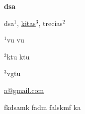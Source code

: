 \documentclass[12pt, twoside, a4paper, hidelinks]{article}
\begin{document}
        \begin{center}  \fontsize{14}{15}\selectfont \textbf{dsa} \end{center}
        \vspace{-0.8cm}\begin{center} \fontsize{12}{13}\selectfont dsa$^{1}$, \underline{kitas}$^{3}$, trecias$^{2}$ \end{center}
        \vspace{-.5cm}

        \begin{center} \fontsize{10}{11}\selectfont $^{1}$vu vu
            
            $^{2}$ktu ktu
            
            $^{3}$vgtu
            
            \underline{a@gmail.com}
         \end{center}

        \fontsize{10}{11}\selectfont fkdsamk fadm falskmf ka
        
\end{document}
